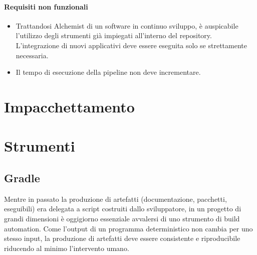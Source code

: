 \paragraph{Requisiti non funzionali}

\begin{itemize}
	\item Trattandosi Alchemist di un software in continuo sviluppo, è auspicabile l'utilizzo degli strumenti già impiegati all'interno del repository. \\ L'integrazione di nuovi applicativi deve essere eseguita solo se strettamente necessaria.
	\item Il tempo di esecuzione della pipeline non deve incrementare.
\end{itemize}

\section{Impacchettamento}\label{ssec:packaging}

\section{Strumenti}

\subsection{Gradle}

Mentre in passato la produzione di artefatti (documentazione, pacchetti, eseguibili) era delegata a script costruiti dallo sviluppatore, in un progetto di grandi dimensioni è oggigiorno essenziale avvalersi di uno strumento di build automation. Come l'output di un programma deterministico non cambia per uno stesso input, la produzione di artefatti deve essere consistente e riproducibile riducendo al minimo l'intervento umano. 

